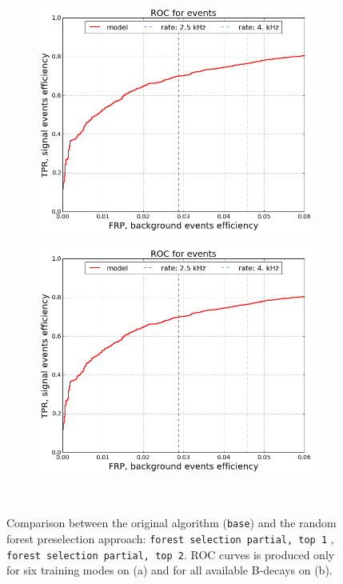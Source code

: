 \documentclass{llncs}
\begin{document}
\begin{figure}
	\begin{center}
    	\begin{subfigure}[b]{0.45\textwidth}
    		\includegraphics[width=\textwidth]{../../img/roc_events.png} \caption{}
    	\end{subfigure} %
    	\begin{subfigure}[b]{0.45\textwidth}
    		\includegraphics[width=\textwidth]{../../img/roc_events.png} \caption{} %
    	\end{subfigure}
    \end{center}
  \caption{Comparison between the original algorithm (\texttt{base}) and the random forest preselection approach: \texttt{forest selection partial, top 1} , \texttt{forest selection partial, top 2}. ROC curves is produced only for six training modes on (a) and for all available B-decays on (b).}~\label{fig:forest_partial}
\end{figure}
\end{document}

